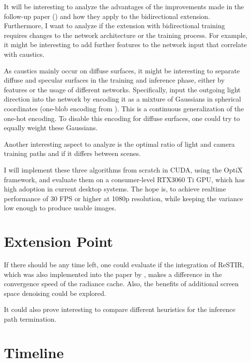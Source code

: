 It will be interesting to analyze the advantages of the improvements made in the follow-up paper (\cite{muller2022}) and how they apply to the bidirectional extension.
Furthermore, I want to analyze if the extension with bidirectional training requires changes to the network architecture or the training process.
For example, it might be interesting to add further features to the network input that correlate with caustics.

As caustics mainly occur on diffuse surfaces, it might be interesting to separate diffuse and specular surfaces in the training and inference phase, either by features or the usage of different networks.
Specifically, \textcite{muller2021} input the outgoing light direction into the network by encoding it as a mixture of Gaussians in spherical coordinates (one-blob encoding from \cite{muller2019}).
This is a continuous generalization of the one-hot encoding.
To disable this encoding for diffuse surfaces, one could try to equally weight these Gaussians.

Another interesting aspect to analyze is the optimal ratio of light and camera training paths and if it differs between scenes.


I will implement these three algorithms from scratch in CUDA, using the OptiX framework, and evaluate them on a consumer-level RTX3060 Ti GPU, which has high adoption in current desktop systems.
The hope is, to achieve realtime performance of 30 FPS or higher at 1080p resolution, while keeping the variance low enough to produce usable images.

\section{Extension Point}

If there should be any time left, one could evaluate if the integration of ReSTIR, which was also implemented into the paper by \textcite{muller2021}, makes a difference in the convergence speed of the radiance cache.
Also, the benefits of additional screen space denoising could be explored.

It could also prove interesting to compare different heuristics for the inference path termination.

\section{Timeline}

